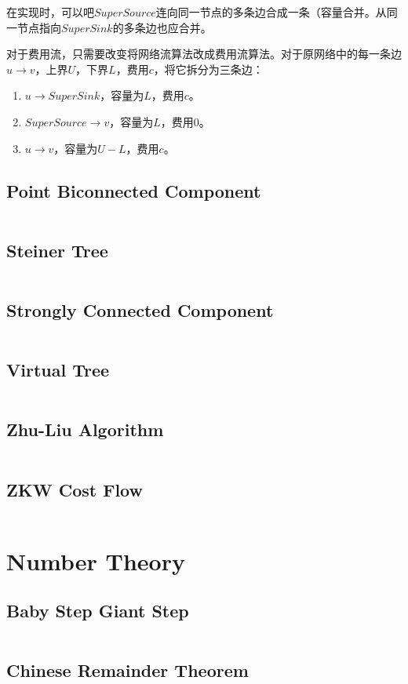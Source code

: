 \documentclass[a4paper,openany]{book}
\newcommand{\cppcode}[1]
{
  \inputminted[mathescape,
  tabsize=4,
  linenos,
  framesep=2mm,
  breakaftergroup=true,
  breakautoindent=true,
  breakbytoken=true,
  breaklines=true,
  fontsize=\small
  ]{cpp}{source/#1}
}
\begin{document}
在实现时，可以吧$SuperSource$连向同一节点的多条边合成一条（容量合并。从同一节点指向$SuperSink$的多条边也应合并。

对于费用流，只需要改变将网络流算法改成费用流算法。对于原网络中的每一条边$u \rightarrow v$，上界$U$，下界$L$，费用$c$，将它拆分为三条边：
\begin{enumerate}[(1)]
\item $u \rightarrow SuperSink$，容量为$L$，费用$c$。
\item $SuperSource \rightarrow v$，容量为$L$，费用$0$。
\item $u \rightarrow v$，容量为$U-L$，费用$c$。
\end{enumerate}
\section{Point Biconnected Component}
\cppcode{/Graph Theory/Point Biconnected Component.cpp}
\section{Steiner Tree}
\cppcode{/Graph Theory/Steiner Tree.cpp}
\section{Strongly Connected Component}
\cppcode{/Graph Theory/Strongly Connected Component.cpp}
\section{Virtual Tree}
\cppcode{/Graph Theory/Virtual Tree.cpp}
\section{Zhu-Liu Algorithm}
\cppcode{/Graph Theory/Zhu-Liu Algorithm.cpp}
\section{ZKW Cost Flow}
\cppcode{/Graph Theory/ZKW Cost Flow.cpp}

\chapter{Number Theory}
\section{Baby Step Giant Step}
\cppcode{/Number Theory/Baby Step Giant Step.cpp}
\section{Chinese Remainder Theorem}
\cppcode{/Number Theory/Chinese Remainder Theorem.cpp}
\end{document}
